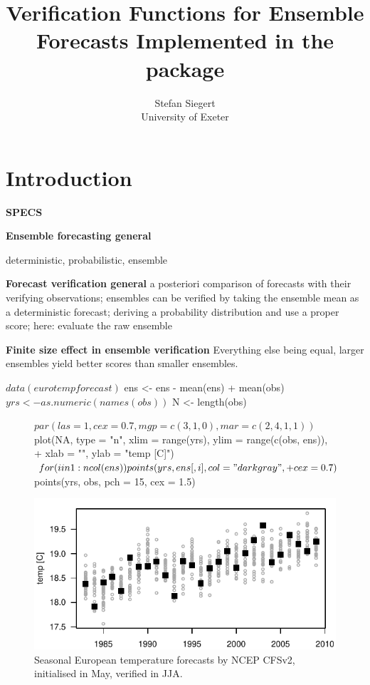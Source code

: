 \documentclass[article]{jss}
\author{Stefan Siegert\\University of Exeter}
\title{Verification Functions for Ensemble Forecasts Implemented in the \proglang{R} package \pkg{SpecsVerification}}
\begin{document}



\section{Introduction}

{\bf SPECS}

{\bf Ensemble forecasting general}

deterministic, probabilistic, ensemble


{\bf Forecast verification general}
a posteriori comparison of forecasts with their verifying observations;
ensembles can be verified by taking the ensemble mean as a deterministic forecast; deriving a probability distribution and use a proper score; here: evaluate the raw ensemble

{\bf Finite size effect in ensemble verification}
Everything else being equal, larger ensembles yield better scores than smaller ensembles.


\begin{Schunk}
\begin{Sinput}
$ data(eurotempforecast)
$ ens <- ens - mean(ens) + mean(obs)
$ yrs <- as.numeric(names(obs))
$ N <- length(obs)
\end{Sinput}
\end{Schunk}


\begin{figure}
\begin{center}
%
\begin{Schunk}
\begin{Sinput}
$ par(las = 1, cex = 0.7, mgp = c(3, 1, 0), mar = c(2, 4, 1, 1))
$ plot(NA, type = "n", xlim = range(yrs), ylim = range(c(obs, ens)), 
+     xlab = "", ylab = "temp [C]")
$ for (i in 1:ncol(ens)) points(yrs, ens[, i], col = "darkgray", 
+     cex = 0.7)
$ points(yrs, obs, pch = 15, cex = 1.5)
\end{Sinput}
\end{Schunk}
\includegraphics{fig-gfs-plot}
%
\end{center}
\caption{Seasonal European temperature forecasts by NCEP CFSv2, initialised in May, verified in JJA.}
\label{gfs-plot}
\end{figure}
\end{document}
